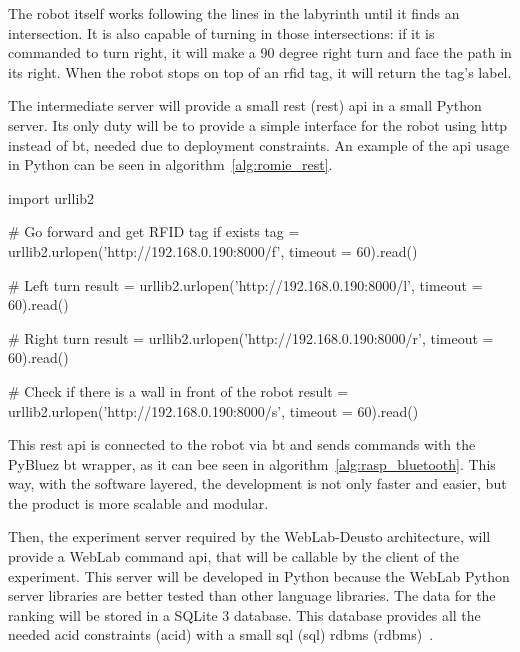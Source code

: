 The robot itself works following the lines in the labyrinth until it finds an intersection. It is
also capable of turning in those intersections: if it is commanded to turn right, it will make a 90
degree right turn and face the path in its right. When the robot stops on top of an \acrshort{rfid}
tag, it will return the tag's label.

The intermediate server will provide a small \acrlong{rest} (\acrshort{rest}) \acrshort{api} in a
small Python server. Its only duty will be to provide a simple interface for the robot using
\acrshort{http} instead of \acrlong{bt}, needed due to deployment constraints. An example of
the \acrshort{api} usage in Python can be seen in algorithm~\ref{alg:romie_rest}.

\begin{center}
\begin{minipage}{.9\textwidth}
\singlespace
{}
\begin{pyglist}[language=python, caption={Romie \acrshort{rest} \acrshort{api} example.},
	label={alg:romie_rest}, listingname={Algorithm}, numbers=left]
import urllib2

# Go forward and get RFID tag if exists
tag = urllib2.urlopen('http://192.168.0.190:8000/f',
    timeout = 60).read()

# Left turn
result = urllib2.urlopen('http://192.168.0.190:8000/l',
    timeout = 60).read()

# Right turn
result = urllib2.urlopen('http://192.168.0.190:8000/r',
    timeout = 60).read()

# Check if there is a wall in front of the robot
result = urllib2.urlopen('http://192.168.0.190:8000/s',
    timeout = 60).read()
\end{pyglist}
\end{minipage}
\end{center}

This \acrshort{rest} \acrshort{api} is connected to the robot via \acrlong{bt} and sends commands
with the PyBluez \acrlong{bt} wrapper, as it can bee seen in algorithm~\ref{alg:rasp_bluetooth}.
This way, with the software layered, the development is not only faster and easier, but the product
is more scalable and modular.

Then, the experiment server required by the WebLab-Deusto architecture, will provide a WebLab
command \acrshort{api}, that will be callable by the client of the experiment. This server will be
developed in Python because the WebLab Python server libraries are better tested than other language
libraries. The data for the ranking will be stored in a SQLite 3 database. This database provides
all the needed \acrshort{acid} constraints (\acrlong{acid}) with a small \acrshort{sql}
(\acrlong{sql}) \acrlong{rdbms} (\acrshort{rdbms})~\cite{sqlite}.

